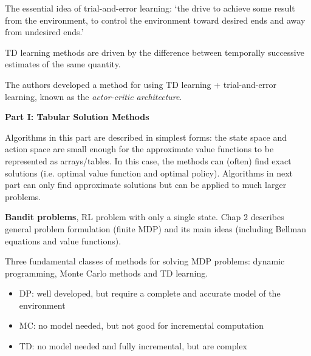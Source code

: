 \documentclass[sutton_barto_notes.tex]{subfiles}
\begin{document}
The essential idea of trial-and-error learning: `the drive to achieve some result from the environment, to control the environment toward desired ends and away from undesired ends.'

TD learning methods are driven by the difference between temporally successive estimates of the same quantity.

The authors developed a method for using TD learning + trial-and-error learning, known as the \textit{actor-critic architecture}.

\newpage
\textbf{Part I: Tabular Solution Methods}

Algorithms in this part are described in simplest forms: the state space and action space are small enough for the approximate value functions to be represented as arrays/tables.
In this case, the methods can (often) find exact solutions (i.e. optimal value function and optimal policy).
Algorithms in next part can only find approximate solutions but can be applied to much larger problems.

\textbf{Bandit problems}, RL problem with only a single state. Chap 2 describes general problem formulation (finite MDP) and its main ideas (including Bellman equations and value functions).

Three fundamental classes of methods for solving MDP problems: dynamic programming, Monte Carlo methods and TD learning.
\begin{itemize}
\item DP: well developed, but require a complete and accurate model of the environment
\item MC: no model needed, but not good for incremental computation
\item TD: no model needed and fully incremental, but are complex
\end{itemize}
\end{document}
